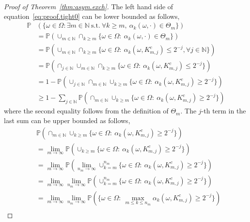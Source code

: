 \documentclass{article}
\theoremstyle{definition}
\renewcommand{\&}{and}
\begin{document}
\begin{proof}[Proof of Theorem~\ref{thm:asym.exch}]
\noindent The left hand side of equation~\eqref{eq:proof.tight0} can be lower bounded as follows,
\begin{align} \label{eq:proof.tight1}
   \mathbb{P} &\left(\{\omega \in \Omega :   \exists m \in \mathbb{N} \ \text{s.t.} \ \forall k\geq m, \ \alpha_{k}(\omega, \cdot) \in \Theta_{m} \} \right)  \nonumber \\
   & = \mathbb{P}\left(\cup_{m\in \mathbb{N}} \cap_{k \geq m} \{\omega \in \Omega :  \ \alpha_{k}(\omega, \cdot) \in \Theta_{m} \} \right)  \nonumber
    \\
   & = \mathbb{P}\left(\cup_{m\in \mathbb{N}} \cap_{k \geq m} \{\omega \in \Omega :  \ \alpha_{k}(\omega, K_{m,j}^{c}) \leq 2^{-j}, \forall j \in \mathbb{N} \} \right) \nonumber \\
   & = \mathbb{P}\left( \cap_{j\in \mathbb{N}} \cup_{m\in \mathbb{N}} \cap_{k \geq m} \{\omega \in \Omega :  \ \alpha_{k}(\omega, K_{m,j}^{c}) \leq 2^{-j} \} \right) \nonumber \\
   & = 1- \mathbb{P}\left( \cup_{j\in \mathbb{N}} \cap_{m\in \mathbb{N}} \cup_{k \geq m} \{\omega \in \Omega :  \ \alpha_{k}(\omega, K_{m,j}^{c}) \geq 2^{-j} \} \right) \nonumber \\
   & \geq 1- \sum_{j\in \mathbb{N}}\mathbb{P}\left(  \cap_{m\in \mathbb{N}} \cup_{k \geq m} \{\omega \in \Omega :  \ \alpha_{k}(\omega, K_{m,j}^{c}) \geq 2^{-j} \} \right) 
\end{align}
where the second equality follows from the definition of $\Theta_{m}$. The $j$-th term in the last sum can be upper bounded as follows,
\begin{align*}
    & \mathbb{P}\left(  \cap_{m\in \mathbb{N}} \cup_{k \geq m} \{\omega \in \Omega :  \ \alpha_{k}(\omega, K_{m,j}^{c}) \geq 2^{-j} \} \right)  \\
    & = \lim_{m \to \infty }\mathbb{P}\left(   \cup_{k \geq m} \{\omega \in \Omega :  \ \alpha_{k}(\omega, K_{m,j}^{c}) \geq 2^{-j} \} \right)  \\
    & = \lim_{m \to \infty }\mathbb{P}\left(    \lim_{n_{m} \to \infty} \cup_{k = m}^{n_{m}} \{\omega \in \Omega :  \ \alpha_{k}(\omega, K_{m,j}^{c}) \geq 2^{-j} \} \right)  \\
       & = \lim_{m \to \infty }  \lim_{n_{m} \to \infty}  \mathbb{P}\left(   \cup_{k = m}^{n_{m}} \{\omega \in \Omega :  \ \alpha_{k}(\omega, K_{m,j}^{c}) \geq 2^{-j} \} \right)  \\
        & = \lim_{m \to \infty }  \lim_{n_{m} \to \infty}  \mathbb{P}\left(    \{\omega \in \Omega :  \  \max_{m\leq k\leq n_{m}}\alpha_{k}(\omega, K_{m,j}^{c}) \geq 2^{-j} \} \right)  \\

\end{align*}
\end{proof}
\end{document}

